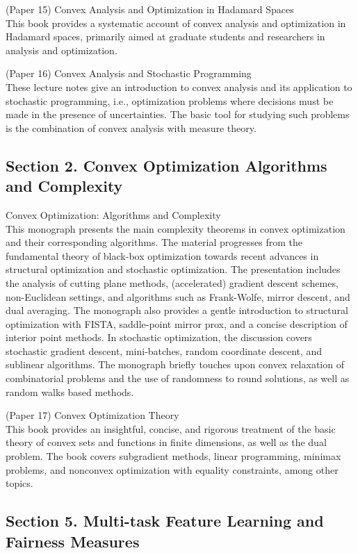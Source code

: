 \documentclass{article}
\begin{document}
(Paper 15) Convex Analysis and Optimization in Hadamard Spaces \\
This book provides a systematic account of convex analysis and optimization in Hadamard spaces, primarily aimed at graduate students and researchers in analysis and optimization.

(Paper 16) Convex Analysis and Stochastic Programming \\
These lecture notes give an introduction to convex analysis and its application to stochastic programming, i.e., optimization problems where decisions must be made in the presence of uncertainties. The basic tool for studying such problems is the combination of convex analysis with measure theory.

\subsection{Section 2. Convex Optimization Algorithms and Complexity}

\cite{Bubeck2014ConvexOA} Convex Optimization: Algorithms and Complexity \\
This monograph presents the main complexity theorems in convex optimization and their corresponding algorithms. The material progresses from the fundamental theory of black-box optimization towards recent advances in structural optimization and stochastic optimization. The presentation includes the analysis of cutting plane methods, (accelerated) gradient descent schemes, non-Euclidean settings, and algorithms such as Frank-Wolfe, mirror descent, and dual averaging. The monograph also provides a gentle introduction to structural optimization with FISTA, saddle-point mirror prox, and a concise description of interior point methods. In stochastic optimization, the discussion covers stochastic gradient descent, mini-batches, random coordinate descent, and sublinear algorithms. The monograph briefly touches upon convex relaxation of combinatorial problems and the use of randomness to round solutions, as well as random walks based methods.

(Paper 17) Convex Optimization Theory \\
This book provides an insightful, concise, and rigorous treatment of the basic theory of convex sets and functions in finite dimensions, as well as the dual problem. The book covers subgradient methods, linear programming, minimax problems, and nonconvex optimization with equality constraints, among other topics.

\subsection{Section 5. Multi-task Feature Learning and Fairness Measures}
\end{document}
